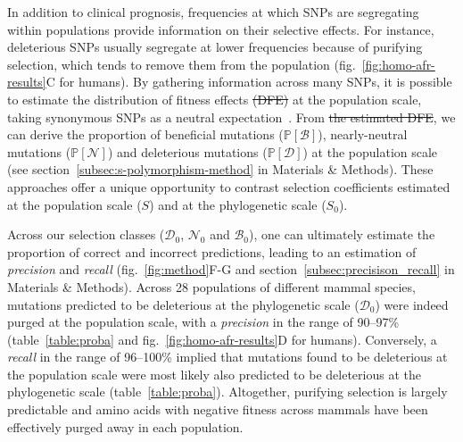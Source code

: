\documentclass{article}
\newcommand{\proba}{\mathbb{P}}
\newcommand{\Sphy}{S_{0}}
\newcommand{\SphyDel}{\mathcal{D}_0}
\newcommand{\SphyNeu}{\mathcal{N}_0}
\newcommand{\SphyBen}{\mathcal{B}_0}
\newcommand{\Spop}{S}
\newcommand{\SpopDel}{\mathcal{D}}
\newcommand{\SpopNeu}{\mathcal{N}}
\newcommand{\SpopBen}{\mathcal{B}}
\newcommand{\ProbaPopDel}{\proba [ \SpopDel]}
\newcommand{\ProbaPopNeu}{\proba [ \SpopNeu ]}
\newcommand{\ProbaPopBen}{\proba [ \SpopBen ]}
\providecommand{\DIFaddtex}[1]{{\protect\color{blue}\uwave{#1}}} %
\providecommand{\DIFdeltex}[1]{{\protect\color{red}\sout{#1}}}                      %
\providecommand{\DIFaddbegin}{} %
\providecommand{\DIFaddend}{} %
\providecommand{\DIFdelbegin}{} %
\providecommand{\DIFdelend}{} %
\providecommand{\DIFadd}[1]{\texorpdfstring{\DIFaddtex{#1}}{#1}} %
\providecommand{\DIFdel}[1]{\texorpdfstring{\DIFdeltex{#1}}{}} %
\newcommand{\DIFscaledelfig}{0.5}
\newlength{\DIFdelgraphicswidth} %
\newlength{\DIFdelgraphicsheight} %
\newcommand{\DIFaddincludegraphics}[2][]{{\color{blue}\fbox{\DIFOincludegraphics[#1]{#2}}}} %
\newcommand{\DIFdelincludegraphics}[2][]{%
\sbox{\DIFdelgraphicsbox}{\DIFOincludegraphics[#1]{#2}}%
\settoboxwidth{\DIFdelgraphicswidth}{\DIFdelgraphicsbox} %
\settoboxtotalheight{\DIFdelgraphicsheight}{\DIFdelgraphicsbox} %
\scalebox{\DIFscaledelfig}{%
\parbox[b]{\DIFdelgraphicswidth}{\usebox{\DIFdelgraphicsbox}\\[-\baselineskip] \rule{\DIFdelgraphicswidth}{0em}}\llap{\resizebox{\DIFdelgraphicswidth}{\DIFdelgraphicsheight}{%
\setlength{\unitlength}{\DIFdelgraphicswidth}%
\begin{picture}(1,1)%
\thicklines\linethickness{2pt} %
{\color[rgb]{1,0,0}\put(0,0){\framebox(1,1){}}}%
{\color[rgb]{1,0,0}\put(0,0){\line( 1,1){1}}}%
{\color[rgb]{1,0,0}\put(0,1){\line(1,-1){1}}}%
\end{picture}%
}\hspace*{3pt}}} %
} %
\DeclareRobustCommand{\DIFaddbegin}{\DIFOaddbegin \let\includegraphics\DIFaddincludegraphics} %
\DeclareRobustCommand{\DIFaddend}{\DIFOaddend \let\includegraphics\DIFOincludegraphics} %
\DeclareRobustCommand{\DIFdelbegin}{\DIFOdelbegin \let\includegraphics\DIFdelincludegraphics} %
\DeclareRobustCommand{\DIFdelend}{\DIFOaddend \let\includegraphics\DIFOincludegraphics} %
\begin{document}
    In addition to clinical prognosis, frequencies at which SNPs are segregating within populations provide information on their selective effects.
    For instance, deleterious SNPs usually segregate at lower frequencies because of purifying selection, which tends to remove them from the population (fig.~\ref{fig:homo-afr-results}C for humans).
    By gathering information across many SNPs, it is possible to estimate the distribution of fitness effects \DIFdelbegin \DIFdel{(DFE) }\DIFdelend at the population scale, taking synonymous SNPs as a neutral expectation~\cite{eyre-walker_distribution_2006, eyre-walker_estimating_2009, galtier_adaptive_2016, tataru_inference_2017}.
    From \DIFdelbegin \DIFdel{the estimated DFE}\DIFdelend \DIFaddbegin \DIFadd{these estimated fitness effects}\DIFaddend , we can derive the proportion of beneficial mutations ($\ProbaPopBen$), nearly-neutral mutations ($\ProbaPopNeu$) and deleterious mutations ($\ProbaPopDel$) at the population scale (see section~\ref{subsec:s-polymorphism-method} in Materials \& Methods\DIFaddbegin \DIFadd{, figs.~S5-S8}\DIFaddend ).
    These approaches offer a unique opportunity to contrast selection coefficients estimated at the population scale ($\Spop$) and at the phylogenetic scale ($\Sphy$).

    Across our selection classes ($\SphyDel$, $\SphyNeu$ and $\SphyBen$), one can ultimately estimate the proportion of correct and incorrect predictions, leading to an estimation of \textit{precision} and \textit{recall} (fig.~\ref{fig:method}F-G and section~\ref{subsec:precisison_recall} in Materials \& Methods).
    Across 28 populations of different mammal species, mutations predicted to be deleterious at the phylogenetic scale ($\SphyDel$) were indeed purged at the population scale, with a \textit{precision} in the range of 90--97\% (table~\ref{table:proba} and fig.~\ref{fig:homo-afr-results}D for humans).
    Conversely, a \textit{recall} in the range of 96--100\% implied that mutations found to be deleterious at the population scale were most likely also predicted to be deleterious at the phylogenetic scale (table~\ref{table:proba}).
    Altogether, purifying selection is largely predictable and amino acids with negative fitness across mammals have been effectively purged away in each population.
\end{document}
